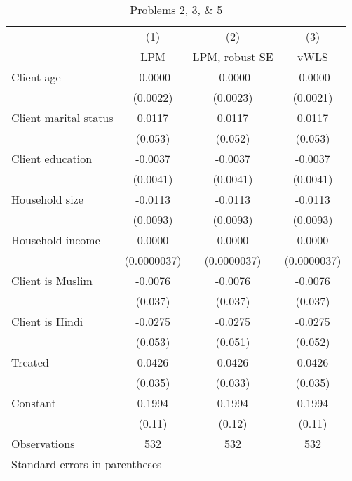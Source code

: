 \begin{table}[htbp]\centering
\caption{Problems 2, 3, \& 5\label{q5}}
\begin{tabular}{l*{3}{c}}
\toprule
                    &\multicolumn{1}{c}{(1)}&\multicolumn{1}{c}{(2)}&\multicolumn{1}{c}{(3)}\\
                    &\multicolumn{1}{c}{LPM}&\multicolumn{1}{c}{LPM, robust SE}&\multicolumn{1}{c}{vWLS}\\
\midrule
Client age          &     -0.0000&     -0.0000&     -0.0000\\
                    &    (0.0022)&    (0.0023)&    (0.0021)\\
\addlinespace
Client marital status&      0.0117&      0.0117&      0.0117\\
                    &     (0.053)&     (0.052)&     (0.053)\\
\addlinespace
Client education    &     -0.0037&     -0.0037&     -0.0037\\
                    &    (0.0041)&    (0.0041)&    (0.0041)\\
\addlinespace
Household size      &     -0.0113&     -0.0113&     -0.0113\\
                    &    (0.0093)&    (0.0093)&    (0.0093)\\
\addlinespace
Household income    &      0.0000&      0.0000&      0.0000\\
                    & (0.0000037)& (0.0000037)& (0.0000037)\\
\addlinespace
Client is Muslim    &     -0.0076&     -0.0076&     -0.0076\\
                    &     (0.037)&     (0.037)&     (0.037)\\
\addlinespace
Client is Hindi     &     -0.0275&     -0.0275&     -0.0275\\
                    &     (0.053)&     (0.051)&     (0.052)\\
\addlinespace
Treated             &      0.0426&      0.0426&      0.0426\\
                    &     (0.035)&     (0.033)&     (0.035)\\
\addlinespace
Constant            &      0.1994&      0.1994&      0.1994\\
                    &      (0.11)&      (0.12)&      (0.11)\\
\midrule
Observations        &         532&         532&         532\\
\bottomrule
\multicolumn{4}{l}{\footnotesize Standard errors in parentheses}\\
\end{tabular}
\end{table}
